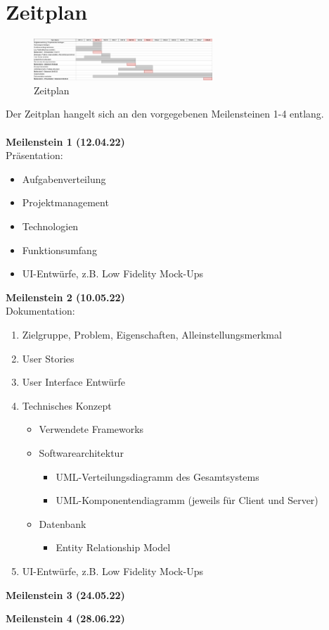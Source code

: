 \chapter*{Zeitplan}


\begin{figure}
    \centering
    \includegraphics[width=0.6\textwidth]{Zeitplan_DeskPlanner.png}
    \caption{Zeitplan}
    \label{fig:Zeitplan}
\end{figure}

Der Zeitplan hangelt sich an den vorgegebenen Meilensteinen 1-4 entlang.
\\
\\
\textbf{Meilenstein 1 (12.04.22)}\\
Präsentation:
\begin{itemize}
    \item Aufgabenverteilung
    \item Projektmanagement
    \item Technologien
    \item Funktionsumfang
    \item UI-Entwürfe, z.B. Low Fidelity Mock-Ups
\end{itemize}

\vspace{0.03\textwidth}
\textbf{Meilenstein 2 (10.05.22)} \\
Dokumentation:
\begin{enumerate}
    \item Zielgruppe, Problem, Eigenschaften, Alleinstellungsmerkmal
    \item User Stories
    \item User Interface Entwürfe
    \item Technisches Konzept
    \begin{itemize}
        \item Verwendete Frameworks
        \item Softwarearchitektur
        \begin{itemize}
            \item UML-Verteilungsdiagramm des Gesamtsystems
            \item UML-Komponentendiagramm (jeweils für Client und Server)
        \end{itemize}
        \item Datenbank
        \begin{itemize}
            \item Entity Relationship Model
        \end{itemize}
    \end{itemize}
    \item UI-Entwürfe, z.B. Low Fidelity Mock-Ups
\end{enumerate}

\textbf{Meilenstein 3 (24.05.22)}

\textbf{Meilenstein 4 (28.06.22)}